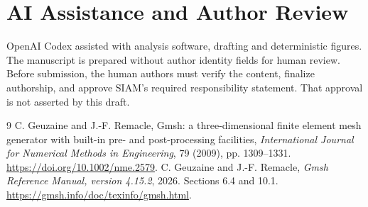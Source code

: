 \documentclass[twoside,leqno,twocolumn]{article}
\begin{document}
\section*{AI Assistance and Author Review}
OpenAI Codex assisted with analysis software, drafting and deterministic figures. The manuscript is prepared without author identity fields for human review. Before submission, the human authors must verify the content, finalize authorship, and approve SIAM's required responsibility statement. That approval is not asserted by this draft.

\begin{thebibliography}{9}
 C. Geuzaine and J.-F. Remacle, Gmsh: a three-dimensional finite element mesh generator with built-in pre- and post-processing facilities, \emph{International Journal for Numerical Methods in Engineering}, 79 (2009), pp. 1309--1331. \url{https://doi.org/10.1002/nme.2579}.
 C. Geuzaine and J.-F. Remacle, \emph{Gmsh Reference Manual, version 4.15.2}, 2026. Sections 6.4 and 10.1. \url{https://gmsh.info/doc/texinfo/gmsh.html}.
\end{thebibliography}
\end{document}
